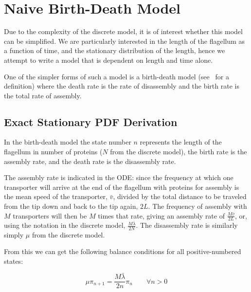 \documentclass[titlepage]{article}
\begin{document}
\section{Naive Birth-Death Model}

Due to the complexity of the discrete model, it is of interest whether this model can be simplified.
We are particularly interested in the length of the flagellum as a function of time, and the stationary distribution of the length, hence we attempt to write a model that is dependent on length and time alone.

One of the simpler forms of such a model is a birth-death model (see~\cite{ross} for a definition) where the death rate is the rate of disassembly and the birth rate is the total rate of assembly.

\subsection{Exact Stationary PDF Derivation}

In the birth-death model the state number $n$ represents the length of the flagellum in number of proteins ($N$ from the discrete model), the birth rate is the assembly rate, and the death rate is the disassembly rate.

The assembly rate is indicated in the ODE: since the frequency at which one transporter will arrive at the end of the flagellum with proteins for assembly is the mean speed of the transporter, $\bar{v}$, divided by the total distance to be traveled from the tip down and back to the tip again, $2 L$.
The frequency of assembly with $M$ transporters will then be $M$ times that rate, giving an assembly rate of $\frac{M \bar{v}}{2 L}$, or, using the notation in the discrete model, $\frac{M \bar\lambda}{2 N}$.
The disassembly rate is similarly simply $\mu$ from the discrete model.

From this we can get the following balance conditions for all positive-numbered states:

\begin{equation*}
 \mu \pi_{n+1} = \frac{M \bar\lambda }{2 n} \pi_n \qquad \forall n > 0
\end{equation*}
\end{document}
